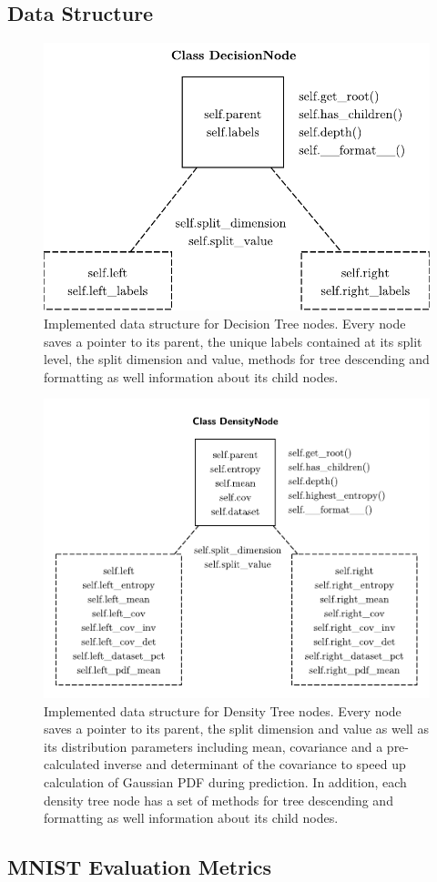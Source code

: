 \documentclass[10pt]{article}
\begin{document}
\subsection{Data Structure}
\begin{figure}[H]
    \centering
    \includegraphics[width=.6\textwidth]{decision-node}
    \caption{Implemented data structure for Decision Tree nodes. Every node saves a pointer to its parent, the unique labels contained at its split level, the split dimension and value, methods for tree descending and formatting as well information about its child nodes.}
    \label{fig:decision-node}
\end{figure}

\begin{figure}[H]
    \centering
    \includegraphics[width=.6\textwidth]{density-node}
    \caption{Implemented data structure for Density Tree nodes. Every node saves a pointer to its parent, the split dimension and value as well as its distribution parameters including mean, covariance and a pre-calculated inverse and determinant of the covariance to speed up calculation of Gaussian \gls{PDF} during prediction. In addition, each density tree node has a set of methods for tree descending and formatting as well information about its child nodes.}
    \label{fig:density-node}
\end{figure}

\subsection{MNIST Evaluation Metrics}
\label{subsec:app-eval-mnist}
\end{document}
